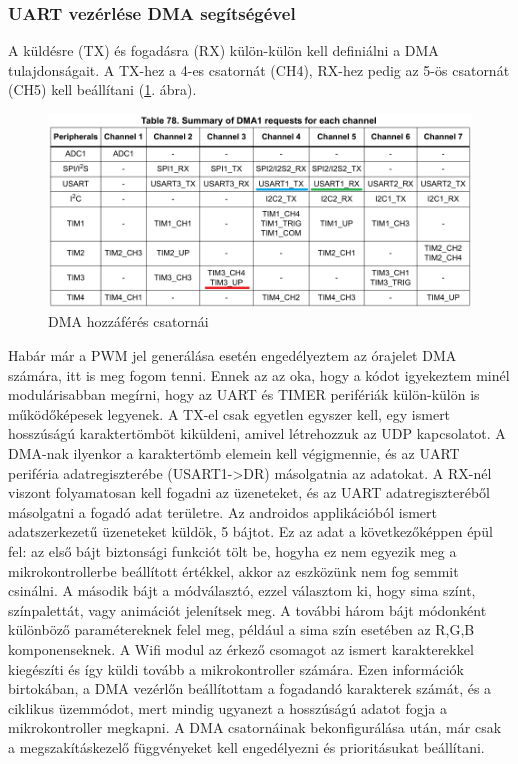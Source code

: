 \documentclass[../main.tex]{subfiles}
\begin{document}
        \subsubsection{UART vezérlése DMA segítségével}
            A küldésre (TX) és fogadásra (RX) külön-külön kell definiálni a DMA tulajdonságait. A TX-hez a 4-es csatornát (CH4), RX-hez pedig az 5-ös csatornát (CH5) kell beállítani (\ref{fig:dma_request}. ábra).
            \begin{figure}[h!]
                \centering
                    \includegraphics[width=12cm]{mbed_res/dma_requests}
                \caption{DMA hozzáférés csatornái \cite{rm0008}}
                \label{fig:dma_request}
            \end{figure}
            
            Habár már a PWM jel generálása esetén engedélyeztem az órajelet DMA számára, itt is meg fogom tenni. Ennek az az oka, hogy a kódot igyekeztem minél modulárisabban megírni, hogy az UART és TIMER perifériák külön-külön is működőképesek legyenek. A TX-el csak egyetlen egyszer kell, egy ismert hosszúságú karaktertömböt kiküldeni, amivel létrehozzuk az UDP kapcsolatot. A DMA-nak ilyenkor a karaktertömb elemein kell végigmennie, és az UART periféria adatregiszterébe (USART1->DR) másolgatnia az adatokat. A RX-nél viszont folyamatosan kell fogadni az üzeneteket, és az UART adatregiszteréből másolgatni a fogadó adat területre. Az androidos applikációból ismert adatszerkezetű üzeneteket küldök, 5 bájtot. Ez az adat a következőképpen épül fel: az első bájt biztonsági funkciót tölt be, hogyha ez nem egyezik meg a mikrokontrollerbe beállított értékkel, akkor az eszközünk nem fog semmit csinálni. A második bájt a módválasztó, ezzel választom ki, hogy sima színt, színpalettát, vagy animációt jelenítsek meg. A további három bájt módonként különböző paramétereknek felel meg, például a sima szín esetében az R,G,B komponenseknek. A Wifi modul az érkező csomagot az ismert karakterekkel kiegészíti és így küldi tovább a mikrokontroller számára. Ezen információk birtokában, a DMA vezérlőn beállítottam a fogadandó karakterek számát, és a ciklikus üzemmódot, mert mindig ugyanezt a hosszúságú adatot fogja a mikrokontroller megkapni. A DMA csatornáinak bekonfigurálása után, már csak a megszakításkezelő függvényeket kell engedélyezni és prioritásukat beállítani.
            
\end{document}
